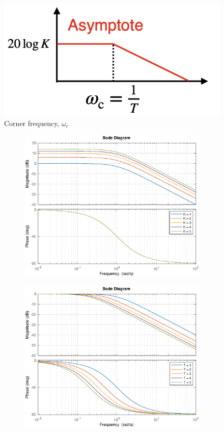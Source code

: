 \documentclass[12pt,a4paper]{article}
\begin{document}
\begin{itemize}
\begin{figure}[H] \centering 
\includegraphics[width=.3\textwidth]{images/corner_1.png}
\caption{Corner frequency, $\omega_{c}$}
\end{figure}
\vspace{-1cm}
\begin{figure}[H]
\hspace{-1.8cm}
\begin{minipage}{0.5\textwidth}
\begin{figure}[H] \centering 
\includegraphics[width=1.2\textwidth]{images/bode_8.eps}
\end{figure}
\end{minipage}\hfill \hspace{-1.6cm}
\begin{minipage}{.5\textwidth}
\begin{figure}[H] \centering
\includegraphics[width=1.2\textwidth]{images/bode_9.eps}

\end{figure}
\end{minipage}
\end{figure}
\end{itemize}
\end{document}

